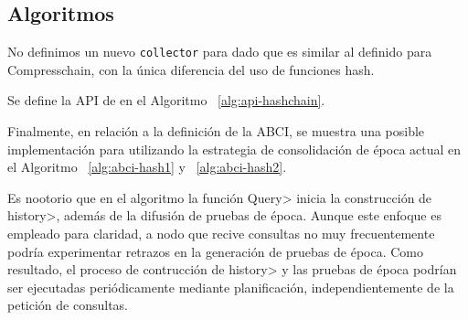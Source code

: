 

\subsection{Algoritmos}\label{subsubsec:details}

No definimos un nuevo \texttt{collector} para \hashchain dado que es similar al definido
para Compresschain, con la única diferencia del uso de funciones hash.

Se define la API de \setchain en el Algoritmo ~\ref{alg:api-hashchain}.


Finalmente, en relación a la definición de la ABCI, se muestra una posible implementación para
\hashchain utilizando la estrategia de consolidación de época actual en el Algoritmo ~\ref{alg:abci-hash1}
y ~\ref{alg:abci-hash2}.

Es nootorio que en el algoritmo la función \<Query> inicia la construcción de \<history>, además de
la difusión de pruebas de época. Aunque este enfoque es empleado para claridad, a nodo que recive consultas
no muy frecuentemente podría experimentar retrazos en la generación de pruebas de época.
Como resultado, el proceso de contrucción de \<history> y las pruebas de época podrían ser ejecutadas
periódicamente mediante planificación, independientemente de la petición de consultas.



%

